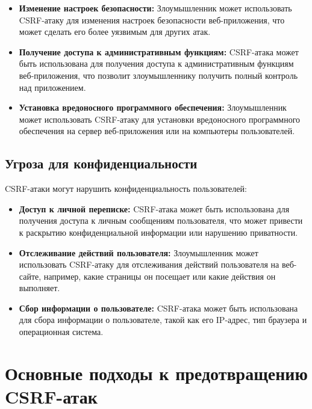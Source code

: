 \documentclass[a4paper,12pt]{diplom}
\begin{document}
	 \begin{itemize}
	 	\item \textbf{Изменение настроек безопасности:}  Злоумышленник может использовать CSRF-атаку для изменения настроек безопасности веб-приложения, что может сделать его более уязвимым для других атак.
	 	\item \textbf{Получение доступа к административным функциям:}  CSRF-атака может быть использована для получения доступа к административным функциям веб-приложения, что позволит злоумышленнику получить полный контроль над приложением.
	 	\item \textbf{Установка вредоносного программного обеспечения:}  Злоумышленник может использовать CSRF-атаку для установки вредоносного программного обеспечения на сервер веб-приложения или на компьютеры пользователей.
	 \end{itemize}
	 
	 \subsection{Угроза для конфиденциальности}
	 
	 CSRF-атаки могут нарушить конфиденциальность пользователей:
	 
	 \begin{itemize}
	 	\item \textbf{Доступ к личной переписке:}  CSRF-атака может быть использована для получения доступа к личным сообщениям пользователя, что может привести к раскрытию конфиденциальной информации или нарушению приватности. 
	 	\item \textbf{Отслеживание действий пользователя:}  Злоумышленник может использовать CSRF-атаку для отслеживания действий пользователя на веб-сайте, например, какие страницы он посещает или какие действия он выполняет.
	 	\item \textbf{Сбор информации о пользователе:}  CSRF-атака может быть использована для сбора информации о пользователе, такой как его IP-адрес, тип браузера и операционная система.
	 \end{itemize} 
	 
	 
	 
	 
	 
	 
	 
	 
	 
	 
	 
	 
	 
	 
	 
	 
	 \section{Основные подходы к предотвращению CSRF-атак}
	 
\end{document}
